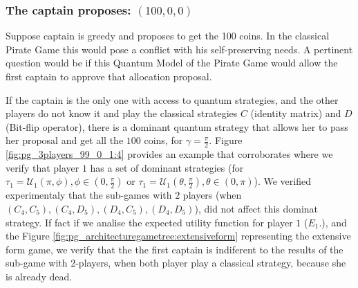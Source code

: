 \begin{table}[h]

\subsubsection{The captain proposes: $(100, 0, 0)$}
\label{subsubsec:3playergame100}

Suppose captain is greedy and proposes to get the 100 coins. In the classical Pirate Game this would pose a conflict with his self-preserving needs. 
A pertinent question would be if this Quantum Model of the Pirate Game would allow the first captain to approve that allocation proposal. 

If the captain is the only one with access to quantum strategies, and the other players do not know it and play the classical strategies $C$ (identity matrix) and $D$ (Bit-flip operator), there is a dominant quantum strategy that allows her to pass her proposal and get all the $100$ coins, for $\gamma = \frac{\pi}{2}$. Figure \ref{fig:pg_3players_99_0_1:4} provides an example that corroborates where we verify that player $1$ has a set of dominant strategies (for $\tau_{1} = \mathcal{U}_{1}(\pi,\phi), \phi \in (0, \frac{\pi}{2})$ or $\tau_{1} = \mathcal{U}_{1}(\theta,\frac{\pi}{2}), \theta \in (0, \pi)$). We verified experimentaly that the sub-games with $2$ players (when $(C_{4},C_{5}), (C_{4},D_{5}), (D_{4},C_{5}), (D_{4},D_{5})$), did not affect this dominat strategy. If fact if we analise the expected utility function for player $1$ ($E_{1}.$), and the Figure \ref{fig:pg_architecturegametree:extensiveform} representing the extensive form game, we verify that the the first captain is indiferent to the results of the sub-game with $2$-players, when both player play a classical strategy, because she is already dead. 


\end{table}
